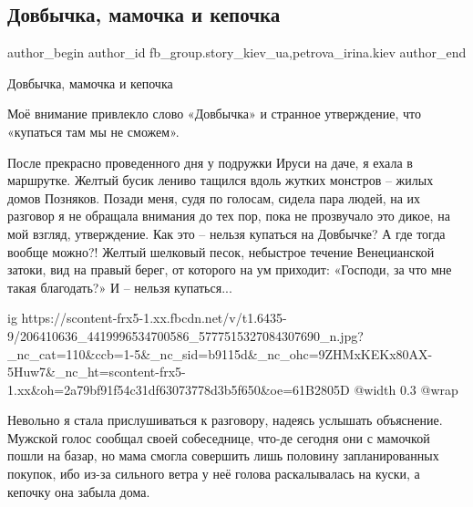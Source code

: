  
 
 
 
 
 
\subsection{Довбычка, мамочка и кепочка}
\label{sec:22_06_2021.fb.fb_group.story_kiev_ua.1.dovbychka_mamochka_kepochka}
 
\ifcmt
 author_begin
   author_id fb_group.story_kiev_ua,petrova_irina.kiev
 author_end
\fi

Довбычка, мамочка и кепочка

Моё внимание привлекло слово «Довбычка» и странное утверждение, что «купаться
там мы не сможем».

После прекрасно проведенного дня у подружки Ируси на даче, я ехала в маршрутке.
Желтый бусик лениво тащился вдоль жутких монстров – жилых домов Позняков.
Позади меня, судя по голосам, сидела пара людей, на их разговор я не обращала
внимания до тех пор, пока не прозвучало это дикое, на мой взгляд, утверждение.
Как это – нельзя купаться на Довбычке? А где тогда вообще можно?! Желтый
шелковый песок, небыстрое течение Венецианской затоки, вид на правый берег, от
которого на ум приходит: «Господи, за что мне такая благодать?» И – нельзя
купаться...

\ifcmt
  ig https://scontent-frx5-1.xx.fbcdn.net/v/t1.6435-9/206410636_4419996534700586_5777515327084307690_n.jpg?_nc_cat=110&ccb=1-5&_nc_sid=b9115d&_nc_ohc=9ZHMxKEKx80AX-5Huw7&_nc_ht=scontent-frx5-1.xx&oh=2a79bf91f54c31df63073778d3b5f650&oe=61B2805D
  @width 0.3
  @wrap 
\fi

Невольно я стала прислушиваться к разговору, надеясь услышать объяснение.
Мужской голос сообщал своей собеседнице, что-де сегодня они с мамочкой пошли на
базар, но мама смогла совершить лишь половину запланированных покупок, ибо
из-за сильного ветра у неё голова раскалывалась на куски, а кепочку она забыла
дома.

